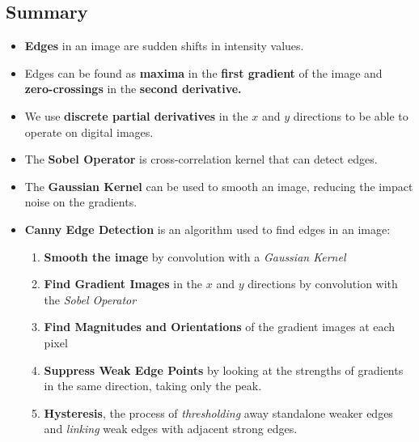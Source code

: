 \documentclass{article}
\begin{document}
\subsection{Summary}
\begin{itemize}
    \item \textbf{Edges} in an image are sudden shifts in intensity values.
    \item Edges can be found as \textbf{maxima} in the \textbf{first gradient} of the image and \textbf{zero-crossings} in the \textbf{second derivative.}
    \item We use \textbf{discrete partial derivatives} in the $x$ and $y$ directions to be able to operate on digital images.
    \item The \textbf{Sobel Operator} is cross-correlation kernel that can detect edges.
    \item The \textbf{Gaussian Kernel} can be used to smooth an image, reducing the impact noise on the gradients.
    \item \textbf{Canny Edge Detection} is an algorithm used to find edges in an image:
    \begin{enumerate}
        \item \textbf{Smooth the image} by convolution with a \textit{Gaussian Kernel}
        \item \textbf{Find Gradient Images} in the $x$ and $y$ directions by convolution with the \textit{Sobel Operator}
        \item \textbf{Find Magnitudes and Orientations} of the gradient images at each pixel
        \item \textbf{Suppress Weak Edge Points} by looking at the strengths of gradients in the same direction, taking only the peak.
        \item \textbf{Hysteresis}, the process of \textit{thresholding} away standalone weaker edges and \textit{linking} weak edges with adjacent strong edges.
    \end{enumerate}
\end{itemize}
\end{document}
